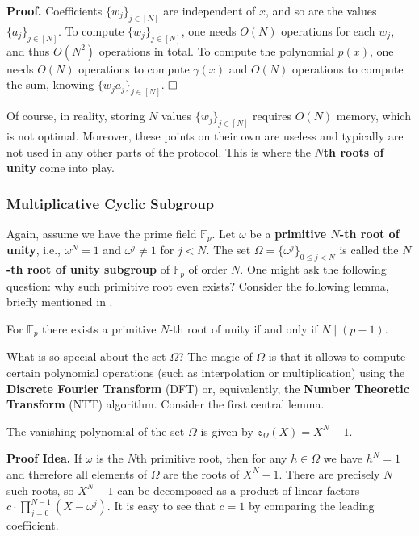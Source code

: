 \documentclass[../lecture-notes-148x210.tex]{subfiles}
\begin{document}
\textbf{Proof.} Coefficients $\{w_j\}_{j \in [N]}$ are independent of $x$, and so 
are the values $\{a_j\}_{j \in [N]}$. To compute $\{w_j\}_{j \in [N]}$, one needs 
$O(N)$ operations for each $w_j$, and thus $O(N^2)$ operations in total. To compute
the polynomial $p(x)$, one needs $O(N)$ operations to compute $\gamma(x)$ and 
$O(N)$ operations to compute the sum, knowing $\{w_ja_j\}_{j \in [N]}$. $\hfill\Box$

Of course, in reality, storing $N$ values $\{w_j\}_{j \in [N]}$ requires $O(N)$
memory, which is not optimal. Moreover, these points on their own are useless 
and typically are not used in any other parts of the protocol. This is where the
\textbf{$N$th roots of unity} come into play.

\subsubsection{Multiplicative Cyclic Subgroup}\label{section:mult-cyclic-g}

Again, assume we have the prime field $\mathbb{F}_p$. Let $\omega$ be a
\textbf{primitive $N$-th root of unity}, i.e., $\omega^N = 1$ and $\omega^j \neq
1$ for $j < N$. The set $\Omega = \{\omega^j\}_{0 \le j < N}$ is called
the \textbf{$N$-th root of unity subgroup} of $\mathbb{F}_p$ of order $N$. One
might ask the following question: why such primitive root even exists? Consider
the following lemma, briefly mentioned in
.

\begin{lemma}
    For $\mathbb{F}_p$ there exists a primitive $N$-th root of unity
    if and only if $N \mid (p-1)$. 
\end{lemma}
What is so special about the set $\Omega$? The magic of $\Omega$ is that it
allows to compute certain polynomial operations (such as interpolation or
multiplication) using the \textbf{Discrete Fourier Transform} (DFT) or, 
equivalently, the \textbf{Number Theoretic Transform} (NTT) algorithm. 
Consider the first central lemma.

\begin{lemma}\label{lemma:vanishing-polynomial}
    The vanishing polynomial of the set $\Omega$ is given by $z_{\Omega}(X) = X^N - 1$.
\end{lemma}

\textbf{Proof Idea.} If $\omega$ is the $N$th primitive root, then for any $h
\in \Omega$ we have $h^N = 1$ and therefore all elements of $\Omega$ are the
roots of $X^N-1$. There are precisely $N$ such roots, so $X^N-1$ can be 
decomposed as a product of linear factors $c \cdot \prod_{j=0}^{N-1}(X-\omega^j)$. 
It is easy to see that $c=1$ by comparing the leading coefficient. 
\end{document}
